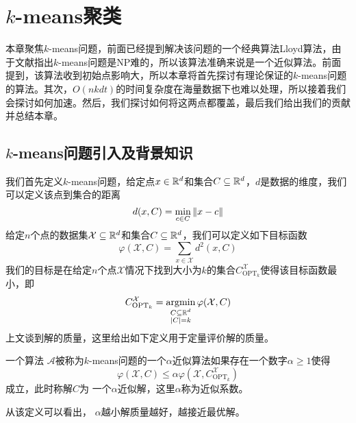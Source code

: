 \chapter{\texorpdfstring{$k$}{k}-means聚类}
本章聚焦$k$-means问题，前面已经提到解决该问题的一个经典算法Lloyd算法，由于文献\cite{garey1982complexity,kleinberg1998microeconomic,mahajan2009planar}指出$k$-means问题是NP难的，所以该算法准确来说是一个近似算法。前面提到，该算法收到初始点影响大，所以本章将首先探讨有理论保证的$k$-means问题的算法。其次，$O(nkdt)$的时间复杂度在海量数据下也难以处理，所以接着我们会探讨如何加速。然后，我们探讨如何将这两点都覆盖，最后我们给出我们的贡献并总结本章。

\section{\texorpdfstring{$k$}{k}-means问题引入及背景知识}
我们首先定义$k$-means问题，给定点$x \in \mathbb{R}^d$和集合$C \subseteq \mathbb{R}^d$，$d$是数据的维度，我们可以定义该点到集合的距离
\begin{equation*}
d(x,C) = \min\limits_{c \in C}\left\lVert x - c\right\rVert
\end{equation*}
给定$n$个点的数据集$\mathcal{X} \subseteq \mathbb{R}^d$和集合$C \subseteq \mathbb{R}^d$，我们可以定义如下目标函数
\begin{equation*}
\varphi(\mathcal{X},C) = \sum_{x \in \mathcal{X}}d^2 (x,C)
\end{equation*}
我们的目标是在给定$n$个点$\mathcal{X}$情况下找到大小为$k$的集合$C_{\text{OPT}_k}^\mathcal{X}$使得该目标函数最小，即
\begin{equation*}
C_{\text{OPT}_k}^\mathcal{X} = \operatorname*{argmin}\limits_{ \substack{C \subseteq \mathbb{R}^d \\ |C| = k} }\varphi(\mathcal{X},C)
\end{equation*}
上文谈到解的质量，这里给出如下定义用于定量评价解的质量。
\begin{definition}[$k$-means问题解的质量]
    \label{def: k-means_quality}
    一个算法 $\mathcal{A}$被称为$k$-means问题的一个$\alpha$近似算法如果存在一个数字$\alpha \geq 1$使得
    \begin{equation*}
        \varphi(\mathcal{X},C) \leq \alpha \varphi(\mathcal{X},C_{\text{OPT}_k}^{\mathcal{X}})
    \end{equation*}
    成立，此时称解$C$为
一个$\alpha$近似解，这里$\alpha$称为近似系数。
\end{definition}
从该定义可以看出， $\alpha$越小解质量越好，越接近最优解。
